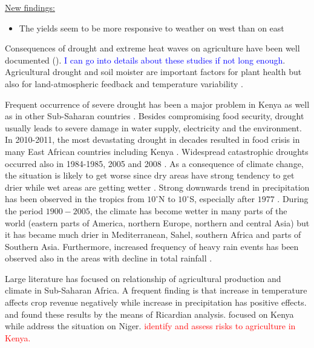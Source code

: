 \documentclass[a4paper,12pt]{article}
\begin{document}
\underline{New findings:}

\begin{itemize}
\item The yields seem to be more responsive to weather on west than on east
\end{itemize}
\normalsize
\FloatBarrier
\pagebreak

Consequences of drought and extreme heat waves on agriculture have been well documented (\citealp{Deschenes2007Ric,RicardianBello,Lesk2016,Mehrabi2017, schwalm2017}). \textcolor{blue}{I can go into details about these studies if not long enough}. Agricultural drought and soil moister are important factors for plant health but also for land-atmospheric feedback and temperature variability \citep{nicolai2017}.


Frequent occurrence of severe drought has been a major problem in Kenya as well as in other Sub-Saharan countries \citep{Compendium,WorldBank2015, Nicholson2017}. Besides compromising food security, drought usually leads to severe damage in water supply, electricity and the environment. In 2010-2011, the most devastating drought in decades resulted in food crisis in many East African countries including Kenya \citep{Chen2015}. Widespread catastrophic droughts occurred also in 1984-1985, 2005 and 2008 \citep{Hastenrath2007, Hastenrath2010, Hastenrath2011, Chen2015}.  As a consequence of climate change, the situation is likely to get worse since dry areas have strong tendency to get drier while wet areas are getting wetter \citep{Trenberth2014, Chen2015, Kabubo2015}. Strong downwards trend in precipitation has been observed in the tropics from $10^\circ$N to $10^\circ$S, especially after $1977$ \citep{IPCCtrenberth}. During the period $1900-2005$, the climate has become wetter in many parts of the world (eastern parts of America, northern Europe, northern and central Asia) but it has became much drier in Mediterranean, Sahel, southern Africa and parts of Southern Asia. Furthermore, increased frequency of heavy rain events has been observed also in the areas with decline in total rainfall \citep{IPCCtrenberth}. 

Large literature has focused on relationship of agricultural production and climate in Sub-Saharan Africa. A frequent finding is that increase in temperature affects crop revenue negatively while increase in precipitation has positive effects.  \cite{RicardianBello} and  \cite{Ochieng2016} found these results by the means of Ricardian analysis. \cite{Ochieng2016} focused on Kenya while \cite{RicardianBello} address the situation on Niger. \cite{WorldBank2015} \textcolor{red}{identify and assess risks to agriculture in Kenya.}
\end{document}
